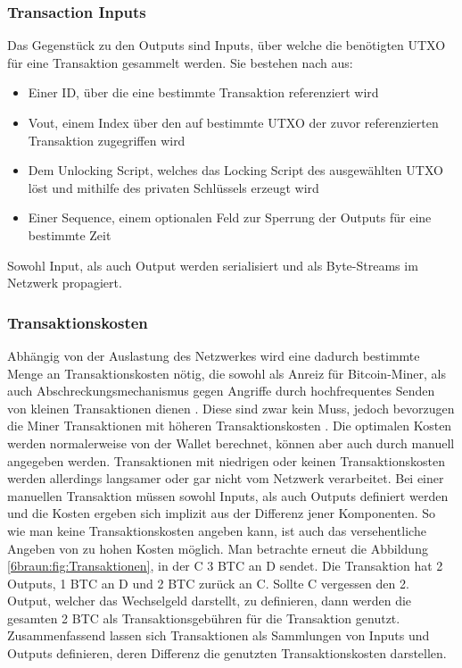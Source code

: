\subsubsection{Transaction Inputs}
Das Gegenstück zu den Outputs sind Inputs, über welche die benötigten UTXO für eine Transaktion gesammelt werden. Sie bestehen nach \cite{antanopoulos_2014} aus:
\begin{itemize}
	\item Einer ID, über die eine bestimmte Transaktion referenziert wird
	\item Vout, einem Index über den auf bestimmte UTXO der zuvor referenzierten Transaktion zugegriffen wird
	\item Dem Unlocking Script, welches das Locking Script des ausgewählten UTXO löst und mithilfe des privaten Schlüssels erzeugt wird
	\item Einer Sequence, einem optionalen Feld zur Sperrung der Outputs für eine bestimmte Zeit
\end{itemize}
Sowohl Input, als auch Output werden serialisiert und als Byte-Streams im Netzwerk propagiert.\\
\subsubsection{Transaktionskosten}
Abhängig von der Auslastung des Netzwerkes wird eine dadurch bestimmte Menge an Transaktionskosten nötig, die sowohl als Anreiz für Bitcoin-Miner, als auch Abschreckungsmechanismus gegen Angriffe durch hochfrequentes Senden von kleinen Transaktionen dienen \cite[]{antanopoulos_2014}.
Diese sind zwar kein Muss, jedoch bevorzugen die Miner Transaktionen mit höheren Transaktionskosten \cite[]{khairuddin_sas_2019}. 
Die optimalen Kosten werden normalerweise von der Wallet berechnet, können aber auch durch manuell angegeben werden. Transaktionen mit niedrigen oder keinen Transaktionskosten werden allerdings langsamer oder gar nicht vom Netzwerk verarbeitet.
Bei einer manuellen Transaktion müssen sowohl Inputs, als auch Outputs definiert werden und die Kosten ergeben sich implizit aus der Differenz jener Komponenten. So wie man keine Transaktionskosten angeben kann, ist auch das versehentliche Angeben von zu hohen Kosten möglich. Man betrachte erneut die Abbildung \ref{6braun:fig:Transaktionen}, in der C 3 BTC an D sendet. Die Transaktion hat 2 Outputs, 1 BTC an D und 2 BTC zurück an C. Sollte C vergessen den 2. Output, welcher das Wechselgeld darstellt, zu definieren, dann werden die gesamten 2 BTC als Transaktionsgebühren für die Transaktion genutzt.
Zusammenfassend lassen sich Transaktionen als Sammlungen von Inputs und Outputs definieren, deren Differenz die genutzten Transaktionskosten darstellen.
